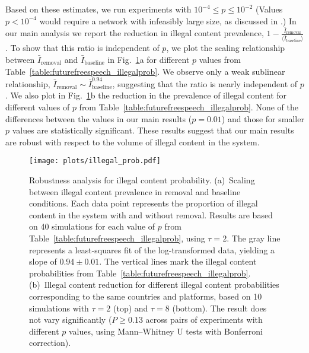 \documentclass{article}
\begin{document}
Based on these estimates, we run experiments with $10^{-4} \le p \le 10^{-2}$ (Values $p<10^{-4}$ would require a network with infeasibly large size, as discussed in .) 
In our main analysis we report the reduction in illegal content prevalence, $1 - \frac{\bar{I}_{\text{removal}}}{\langle \bar{I}_{\text{baseline}} \rangle}$. To show that this ratio is independent of $p$, we plot the scaling relationship between $\bar{I}_{\text{removal}}$ and $\bar{I}_{\text{baseline}}$ in Fig.~\ref{fig:illegal_prob}a for different $p$ values from Table~\ref{table:futurefreespeech_illegalprob}. We observe only a weak sublinear relationship, $\bar{I}_{\text{removal}} \sim \bar{I}_{\text{baseline}}^{0.94}$, suggesting that the ratio is nearly independent of $p$. 
We also plot in Fig.~\ref{fig:illegal_prob}b the reduction in the prevalence of illegal content for different values of $p$ from Table~\ref{table:futurefreespeech_illegalprob}. None of the differences between the values in our main results ($p=0.01$) and those for smaller $p$ values are statistically significant. 
These results suggest that our main results are robust with respect to the volume of illegal content in the system. 

\begin{figure}
\centering
\texttt{[image: plots/illegal\_prob.pdf]}
\caption{Robustness analysis for illegal content probability. 
(a)~Scaling between illegal content prevalence in removal and baseline conditions. Each data point represents the proportion of illegal content in the system with and without removal. 
Results are based on 40 simulations for each value of $p$ from Table~\ref{table:futurefreespeech_illegalprob}, using $\tau=2$. 
The gray line represents a least-squares fit of the log-transformed data, yielding a slope of $0.94 \pm 0.01$. 
The vertical lines mark the illegal content probabilities from Table~\ref{table:futurefreespeech_illegalprob}. 
(b)~Illegal content reduction for different illegal content probabilities corresponding to the same countries and platforms,   
based on 10 simulations with $\tau=2$ (top) and $\tau=8$ (bottom). The result does not vary significantly ($P \ge 0.13$ across pairs of experiments with different $p$ values, using Mann–Whitney U tests with Bonferroni correction).}
\label{fig:illegal_prob}
\end{figure}
\end{document}
